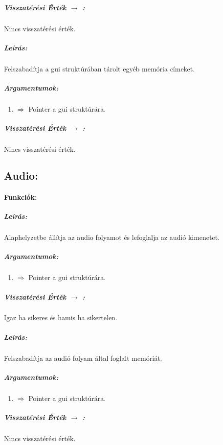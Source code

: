 \documentclass{article}
\begin{document}
\subparagraph{Visszatérési Érték \(\rightarrow\) :}
Nincs visszatérési érték.
\chline


\subparagraph{Leírás:}
Felszabadítja a gui struktúrában tárolt egyéb memória címeket.

\subparagraph{Argumentumok:}
\begin{enumerate}
    \item {} \(\Rightarrow\) Pointer a gui struktúrára.
\end{enumerate}

\subparagraph{Visszatérési Érték \(\rightarrow\) :}
Nincs visszatérési érték.
\chline

\subsection{Audio:}

\paragraph{Funkciók:}


\subparagraph{Leírás:}
Alaphelyzetbe állítja az audio folyamot és lefoglalja
az audió kimenetet.

\subparagraph{Argumentumok:}
\begin{enumerate}
    \item {} \(\Rightarrow\) Pointer a gui struktúrára.
\end{enumerate}

\subparagraph{Visszatérési Érték \(\rightarrow\) :}
Igaz ha sikeres és hamis ha sikertelen.
\chline


\subparagraph{Leírás:}
Felszabadítja az audió folyam által foglalt memóriát.

\subparagraph{Argumentumok:}
\begin{enumerate}
    \item {} \(\Rightarrow\) Pointer a gui struktúrára.
\end{enumerate}

\subparagraph{Visszatérési Érték \(\rightarrow\) :}
Nincs visszatérési érték.
\chline

\end{document}
